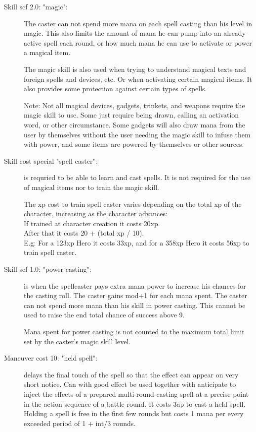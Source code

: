 \begin{description}


\item[Skill scf 2.0: "magic":] The caster can not spend more mana on each spell casting than his level in magic. This also limits the amount of mana he can pump into an already active spell each round, or how much mana he can use to activate or power a magical item.

The magic skill is also used when trying to understand magical texts and foreign spells and devices, etc. Or when activating certain magical items. It also provides some protection against certain types of spells.

Note: Not all magical devices, gadgets, trinkets, and weapons require the magic skill to use. Some just require being drawn, calling an activation word, or other circumstance. Some gadgets will also draw mana from the user by themselves without the user needing the magic skill to infuse them with power, and some items are powered by themselves or other sources.


\item[Skill cost special "spell caster":] is requried to be able to learn and cast spells. It is not required for the use of magical items nor to train the magic skill.

The xp cost to train spell caster varies depending on the total xp of the character, increasing as the character advances:\\
If trained at character creation it costs 20xp.\\
After that it costs 20 + (total xp / 10).\\
E.g: For a 123xp Hero it costs 33xp, and for a 358xp Hero it costs 56xp to train spell caster.


\item[Skill scf 1.0: "power casting":] is when the spellcaster pays extra mana power to increase his chances for the casting roll. The caster gains mod+1 for each mana spent. The caster can not spend more mana than his skill in power casting. This cannot be used to raise the end total chance of success above 9.

Mana spent for power casting is not counted to the maximum total limit set by the caster's magic skill level.


\item[Maneuver cost 10: "held spell":] delays the final touch of the spell so that the effect can appear on very short notice. Can with good effect be used together with anticipate to inject the effects of a prepared multi-round-casting spell at a precise point in the action sequence of a battle round. It costs 3ap to cast a held spell. Holding a spell is free in the first few rounds but costs 1 mana per every exceeded period of 1 + int/3 rounds.


\end{description}
